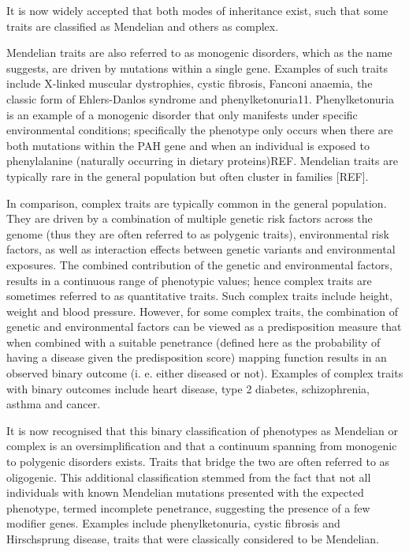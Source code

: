It is now widely accepted that both modes of inheritance exist, such that some traits are classified as Mendelian and others as complex.

Mendelian traits are also referred to as monogenic disorders, which as the name suggests, are driven by mutations within a single gene. Examples of such traits include X-linked muscular dystrophies, cystic fibrosis, Fanconi anaemia, the classic form of Ehlers-Danlos syndrome and phenylketonuria11. Phenylketonuria is an example of a monogenic disorder that only manifests under specific environmental conditions; specifically the phenotype only occurs when there are both mutations within the PAH gene and when an individual is exposed to phenylalanine (naturally occurring in dietary proteins)REF. Mendelian traits are typically rare in the general population but often cluster in families [REF]. 

In comparison, complex traits are typically common in the general population. They are driven by a combination of multiple genetic risk factors across the genome (thus they are often referred to as polygenic traits), environmental risk factors, as well as interaction effects between genetic variants and environmental exposures. The combined contribution of the genetic and environmental factors, results in a continuous range of phenotypic values; hence complex traits are sometimes referred to as quantitative traits. Such complex traits include height, weight and blood pressure. However, for some complex traits, the combination of genetic and environmental factors can be viewed as a predisposition measure that when combined with a suitable penetrance (defined here as the probability of having a disease given the predisposition score) mapping function results in an observed binary outcome (i. e. either diseased or not). Examples of complex traits with binary outcomes include heart disease, type 2 diabetes, schizophrenia, asthma and cancer. 

It is now recognised that this binary classification of phenotypes as Mendelian or complex is an oversimplification and that a continuum spanning from monogenic to polygenic disorders exists. Traits that bridge the two are often referred to as oligogenic. This additional classification stemmed from the fact that not all individuals with known Mendelian mutations presented with the expected phenotype, termed incomplete penetrance, suggesting the presence of a few modifier genes. Examples include phenylketonuria, cystic fibrosis and Hirschsprung disease, traits that were classically considered to be Mendelian.
